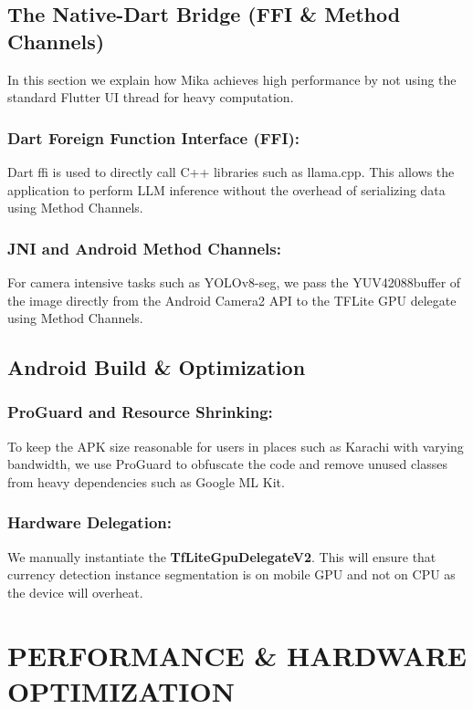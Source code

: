 \documentclass[12pt,a4paper]{report}
\begin{document}
\section{The Native-Dart Bridge (FFI \& Method Channels)}
In this section we explain how Mika achieves high performance by not using the standard Flutter UI thread for heavy computation. 
 
\subsection{Dart Foreign Function Interface (FFI):}
Dart ffi is used to directly call C++ libraries such as llama.cpp. This allows the application to perform LLM inference without the overhead of serializing data using Method Channels.

\subsection{JNI and Android Method Channels:} For camera intensive tasks such as YOLOv8-seg, we pass the YUV42088buffer of the image directly from the Android Camera2 API to the TFLite GPU delegate using Method Channels. 

\section{Android Build \& Optimization}
\subsection{ProGuard and Resource Shrinking:} 
To keep the APK size reasonable for users in places such as Karachi with varying bandwidth, we use ProGuard to obfuscate the code and remove unused classes from heavy dependencies such as Google ML Kit. 

\subsection{Hardware Delegation:}
We manually instantiate the \textbf{TfLiteGpuDelegateV2}. This will ensure that currency detection instance segmentation is on mobile GPU and not on CPU as the device will overheat. 

\chapter{PERFORMANCE \& HARDWARE OPTIMIZATION}
 
\end{document}
